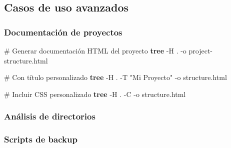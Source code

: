 \documentclass[
  11pt,
  letterpaper,
  oneside,
  openany]{scrbook}
\newenvironment{Shaded}{}{}
\newcommand{\AttributeTok}[1]{\textcolor[rgb]{0.84,0.23,0.29}{#1}}
\newcommand{\CommentTok}[1]{\textcolor[rgb]{0.42,0.45,0.49}{#1}}
\newcommand{\ExtensionTok}[1]{\textcolor[rgb]{0.84,0.23,0.29}{\textbf{#1}}}
\newcommand{\FunctionTok}[1]{\textcolor[rgb]{0.44,0.26,0.76}{#1}}
\newcommand{\KeywordTok}[1]{\textcolor[rgb]{0.84,0.23,0.29}{#1}}
\newcommand{\NormalTok}[1]{\textcolor[rgb]{0.14,0.16,0.18}{#1}}
\newcommand{\StringTok}[1]{\textcolor[rgb]{0.01,0.18,0.38}{#1}}
\begin{document}
\subsection{Casos de uso avanzados}\label{casos-de-uso-avanzados-1}

\subsubsection{Documentación de
proyectos}\label{documentaciuxf3n-de-proyectos}

\begin{Shaded}
\begin{Highlighting}[]
\CommentTok{\# Generar documentación HTML del proyecto}
\ExtensionTok{tree} \AttributeTok{{-}H}\NormalTok{ . }\AttributeTok{{-}o}\NormalTok{ project{-}structure.html}

\CommentTok{\# Con título personalizado}
\ExtensionTok{tree} \AttributeTok{{-}H}\NormalTok{ . }\AttributeTok{{-}T} \StringTok{"Mi Proyecto"} \AttributeTok{{-}o}\NormalTok{ structure.html}

\CommentTok{\# Incluir CSS personalizado}
\ExtensionTok{tree} \AttributeTok{{-}H}\NormalTok{ . }\AttributeTok{{-}C} \AttributeTok{{-}o}\NormalTok{ structure.html}
\end{Highlighting}
\end{Shaded}

\subsubsection{Análisis de
directorios}\label{anuxe1lisis-de-directorios}

\begin{Shaded}
\end{Shaded}

\subsubsection{Scripts de backup}\label{scripts-de-backup}
\end{document}
